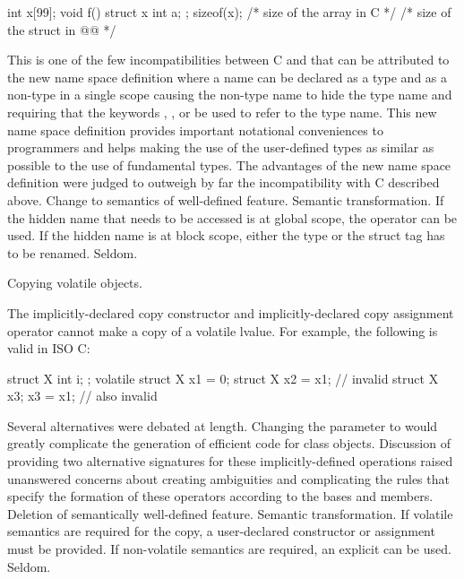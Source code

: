 \begin{codeblock}
int x[99];
void f() {
  struct x { int a; };
  sizeof(x);  /* size of the array in C */
  /* size of the struct in @\textit{\textrm{\Cpp{}}}@ */
}
\end{codeblock}
\rationale
This is one of the few incompatibilities between C and \Cpp{} that
can be attributed to the new \Cpp{} name space definition where a
name can be declared as a type and as a non-type in a single scope
causing the non-type name to hide the type name and requiring that
the keywords , ,  or  be used to refer to the type name.
This new name space definition provides important notational
conveniences to \Cpp{} programmers and helps making the use of the
user-defined types as similar as possible to the use of fundamental
types.
The advantages of the new name space definition were judged to
outweigh by far the incompatibility with C described above.
\effect
Change to semantics of well-defined feature.
\difficulty
Semantic transformation.
If the hidden name that needs to be accessed is at global scope,
the \tcode{::} \Cpp{} operator can be used.
If the hidden name is at block scope, either the type or the struct
tag has to be renamed.
\howwide
Seldom.

\change
Copying volatile objects.

The implicitly-declared copy constructor and
implicitly-declared copy assignment operator
cannot make a copy of a volatile lvalue.
For example, the following is valid in ISO C:

\begin{codeblock}
struct X { int i; };
volatile struct X x1 = {0};
struct X x2 = x1;               // invalid \Cpp{}
struct X x3;
x3 = x1;                        // also invalid \Cpp{}
\end{codeblock}

\rationale
Several alternatives were debated at length.
Changing the parameter to
would greatly complicate the generation of
efficient code for class objects.
Discussion of
providing two alternative signatures for these
implicitly-defined operations raised
unanswered concerns about creating
ambiguities and complicating
the rules that specify the formation of
these operators according to the bases and
members.
\effect
Deletion of semantically well-defined feature.
\difficulty
Semantic transformation.
If volatile semantics are required for the copy,
a user-declared constructor or assignment must
be provided.
If non-volatile semantics are required,
an explicit
can be used.
\howwide
Seldom.

